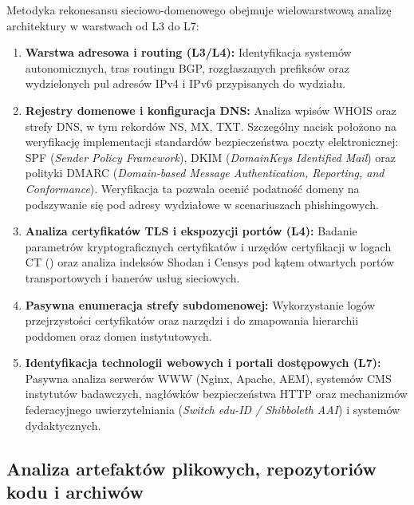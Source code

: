 Metodyka rekonesansu sieciowo-domenowego obejmuje wielowarstwową analizę architektury w warstwach od L3 do L7:
\begin{enumerate}
    \item \textbf{Warstwa adresowa i routing (L3/L4):} Identyfikacja systemów autonomicznych, tras routingu BGP, rozgłaszanych prefiksów oraz wydzielonych pul adresów IPv4 i IPv6 przypisanych do wydziału.
    \item \textbf{Rejestry domenowe i konfiguracja DNS:} Analiza wpisów WHOIS oraz strefy DNS, w tym rekordów NS, MX, TXT. Szczególny nacisk położono na weryfikację implementacji standardów bezpieczeństwa poczty elektronicznej: SPF (\textit{Sender Policy Framework}), DKIM (\textit{DomainKeys Identified Mail}) oraz polityki DMARC (\textit{Domain-based Message Authentication, Reporting, and Conformance}). Weryfikacja ta pozwala ocenić podatność domeny na podszywanie się pod adresy wydziałowe w scenariuszach phishingowych.
    \item \textbf{Analiza certyfikatów TLS i ekspozycji portów (L4):} Badanie parametrów kryptograficznych certyfikatów i urzędów certyfikacji w logach CT () oraz analiza indeksów Shodan i Censys pod kątem otwartych portów transportowych i banerów usług sieciowych.
    \item \textbf{Pasywna enumeracja strefy subdomenowej:} Wykorzystanie logów przejrzystości certyfikatów oraz narzędzi  i  do zmapowania hierarchii poddomen  oraz domen instytutowych.
    \item \textbf{Identyfikacja technologii webowych i portali dostępowych (L7):} Pasywna analiza serwerów WWW (Nginx, Apache, AEM), systemów CMS instytutów badawczych, nagłówków bezpieczeństwa HTTP oraz mechanizmów federacyjnego uwierzytelniania (\textit{Switch edu-ID / Shibboleth AAI}) i systemów dydaktycznych.
\end{enumerate}

\subsection{Analiza artefaktów plikowych, repozytoriów kodu i archiwów}\label{subsec:metodyka-artefakty-archiwa}

